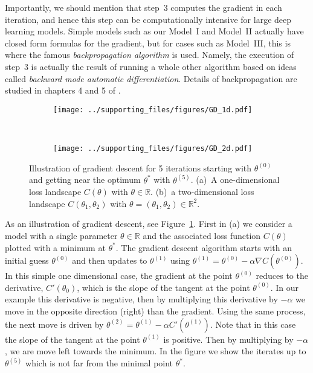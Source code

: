Importantly, we should mention that step~3 computes the gradient in each iteration, and hence this step can be computationally intensive for large deep learning models. Simple models such as our Model~I and Model~II actually have closed form formulas for the gradient, but for cases such as Model~III, this is where the famous {\em backpropagation algorithm} is used. Namely, the  execution of step~3 is actually the result of running a whole other algorithm based on ideas called {\em backward mode automatic differentiation}. Details of backpropagation are studied in chapters 4 and 5 of \cite{LiquetMokaNazarathy2024DeepLearning}.

\begin{figure}[h!] 
  \begin{subfigure}[b]{0.5\linewidth}
    \centering
    \texttt{[image: ../supporting\_files/figures/GD\_1d.pdf]}
    \caption{} 
    \vspace{2ex}
  \end{subfigure}%
  ~
  \begin{subfigure}[b]{0.5\linewidth}
    \centering
    \texttt{[image: ../supporting\_files/figures/GD\_2d.pdf]}
    \caption{} 
    \vspace{2ex}
  \end{subfigure} 
    \caption{Illustration of gradient descent for 5 iterations starting with $\theta^{(0)}$ and getting near the optimum $\theta^*$ with $\theta^{(5)}$. (a)~A one-dimensional loss landscape $C(\theta)$ with $\theta \in \mathbb{R}$. (b)~a two-dimensional loss landscape $C(\theta_1,\theta_2)$ with $\theta = (\theta_1, \theta_2) \in \mathbb{R}^2$.}
    \label{simpleloss}
\end{figure}

As an illustration of gradient descent, see Figure~\ref{simpleloss}. First in (a) we consider a  model with a single parameter $\theta \in \mathbb{R}$ and the associated loss function $C(\theta)$ plotted with a minimum at $\theta^*$.  The gradient descent algorithm starts with an initial guess $\theta^{(0)}$ and then updates to $\theta^{(1)}$ using $\theta^{(1)} = \theta^{(0)} - \alpha \nabla C(\theta^{(0)})$. In this simple one dimensional case, the gradient at the point $\theta^{(0)}$ reduces to the derivative, $C'(\theta_0)$, which is the slope of the tangent at the point $\theta^{(0)}$. In our example this derivative is negative, then by multiplying this derivative by $-\alpha$ we move in the opposite direction (right) than the gradient. Using the same process, the next move is driven by $\theta^{(2)} = \theta^{(1)} - \alpha  C'(\theta^{(1)})$. Note that in this case the slope of the tangent at the point $\theta^{(1)}$ is positive. Then by multiplying by $- \alpha $, we are move left towards the minimum. In the figure we show the iterates up to $\theta^{(5)}$ which is not far from the minimal point $\theta^*$.

